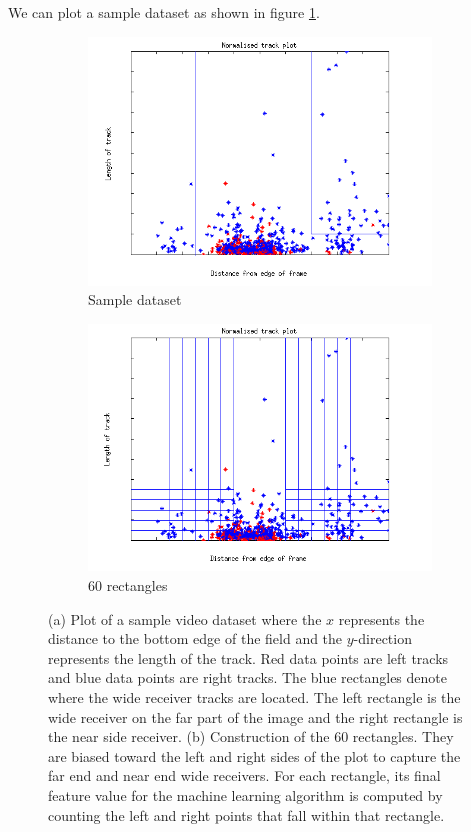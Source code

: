 \documentclass{article} %
\begin{document}
We can plot a sample dataset as shown in figure \ref{fig:plot_sample}.

\begin{figure}
\centering
 \begin{subfigure}{.5\textwidth}
  \centering
  \includegraphics[width=1\linewidth]{img/aaa.png}
  \caption{Sample dataset}
  \label{fig:plot_sample}
 \end{subfigure}%
 \begin{subfigure}{.5\textwidth}
  \centering
  \includegraphics[width=1\linewidth]{img/aaa1.png}
  \caption{60 rectangles}
  \label{fig:plot_rectangles}
 \end{subfigure}
\caption{(a) Plot of a sample video dataset where the $x$ represents the distance to the bottom edge of the field and the $y$-direction represents the length of the track. Red data points are left tracks and blue data points are right tracks. The blue rectangles denote where the wide receiver tracks are located. The left rectangle is the wide receiver on the far part of the image and the right rectangle is the near side receiver. (b) Construction of the 60 rectangles. They are biased toward the left and right sides of the plot to capture the far end and near end wide receivers. For each rectangle, its final feature value for the machine learning algorithm is computed by counting the left and right points that fall within that rectangle.}
\label{fig:plot}
\end{figure}
\end{document}

